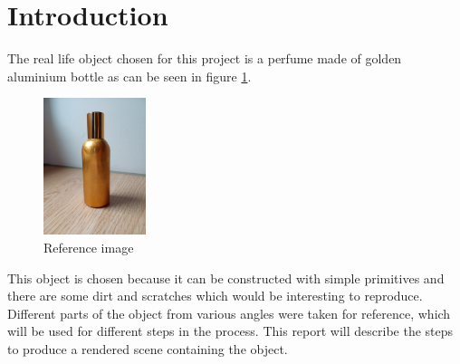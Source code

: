 \section{Introduction}
The real life object chosen for this project is a perfume made of golden aluminium bottle as can be seen in figure \ref{fig:ref}.

\begin{figure}[htpb]
  \includegraphics[width=3cm]{imgs/ref.jpg}
  \caption{Reference image}
  \label{fig:ref}
\end{figure}

This object is chosen because it can be constructed with simple primitives and there are some dirt and scratches which would be interesting to reproduce. Different parts of the object from various angles were taken for reference, which will be used for different steps in the process.
This report will describe the steps to produce a rendered scene containing the object.


